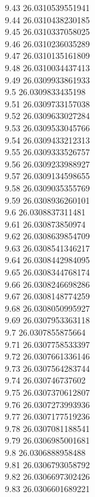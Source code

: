 {9.43	26.0310539551941\\
9.44	26.0310438230185\\
9.45	26.0310337058025\\
9.46	26.0310236035289\\
9.47	26.0310135161809\\
9.48	26.0310034437413\\
9.49	26.0309933861933\\
9.5	26.0309833435198\\
9.51	26.0309733157038\\
9.52	26.0309633027284\\
9.53	26.0309533045766\\
9.54	26.0309433212313\\
9.55	26.0309333526757\\
9.56	26.0309233988927\\
9.57	26.0309134598655\\
9.58	26.0309035355769\\
9.59	26.0308936260101\\
9.6	26.0308837311481\\
9.61	26.030873850974\\
9.62	26.0308639854709\\
9.63	26.0308541346217\\
9.64	26.0308442984095\\
9.65	26.0308344768174\\
9.66	26.0308246698286\\
9.67	26.0308148774259\\
9.68	26.0308050995927\\
9.69	26.0307953363118\\
9.7	26.0307855875664\\
9.71	26.0307758533397\\
9.72	26.0307661336146\\
9.73	26.0307564283744\\
9.74	26.030746737602\\
9.75	26.0307370612807\\
9.76	26.0307273993936\\
9.77	26.0307177519236\\
9.78	26.0307081188541\\
9.79	26.0306985001681\\
9.8	26.0306888958488\\
9.81	26.0306793058792\\
9.82	26.0306697302426\\
9.83	26.0306601689221\\
}
